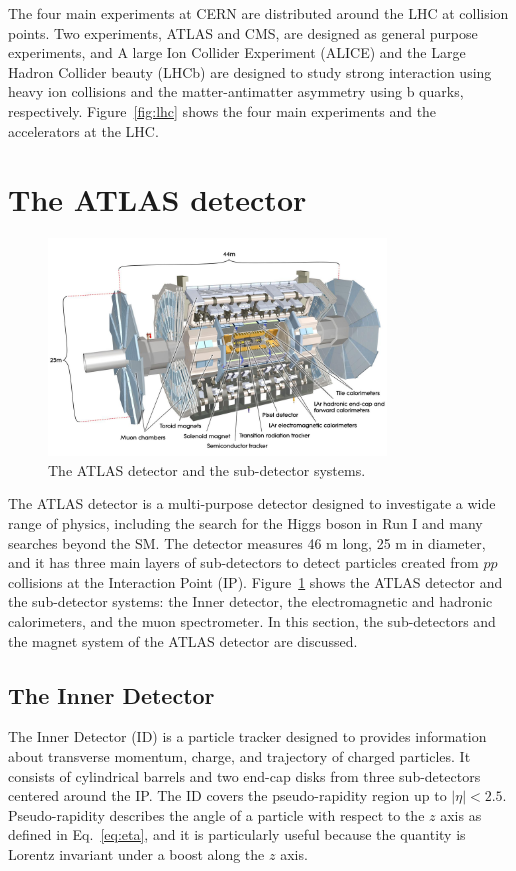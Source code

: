 The four main experiments at CERN are distributed around the LHC at collision points. Two experiments, ATLAS and CMS, are designed as general purpose experiments, and A large Ion Collider Experiment (ALICE) and the Large Hadron Collider beauty (LHCb) are designed to study strong interaction using heavy ion collisions and the matter-antimatter asymmetry using b quarks, respectively. Figure~\ref{fig:lhc} shows the four main experiments and the accelerators at the LHC.


\section{The ATLAS detector}
\label{sec:atlas:detector}

\begin{figure}[!htb]
    \includegraphics[width=0.8\textwidth]{figs/atlas.png}
    \centering
    \caption{The ATLAS detector and the sub-detector systems.}
    \label{fig:atlas}
\end{figure}

The ATLAS detector is a multi-purpose detector designed to investigate a wide range of physics, including the search for the Higgs boson in Run I and many searches beyond the SM. The detector measures 46 m long, 25 m in diameter, and it has three main layers of sub-detectors to detect particles created from $pp$ collisions at the Interaction Point (IP). Figure~\ref{fig:atlas} shows the ATLAS detector and the sub-detector systems: the Inner detector, the electromagnetic and hadronic calorimeters, and the muon spectrometer. In this section, the sub-detectors and the magnet system of the ATLAS detector are discussed.

\subsection{The Inner Detector}
\label{sec:atlas:id}
The Inner Detector (ID) is a particle tracker designed to provides information about transverse momentum, charge, and trajectory of charged particles. It consists of cylindrical barrels and two end-cap disks from three sub-detectors centered around the IP. The ID covers the pseudo-rapidity region up to $|\eta| < 2.5$. Pseudo-rapidity describes the angle of a particle with respect to the $z$ axis as defined in Eq.~\ref{eq:eta}, and it is particularly useful because the quantity is Lorentz invariant under a boost along the $z$ axis.

